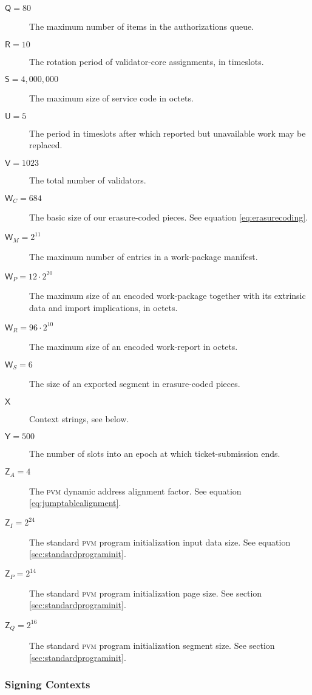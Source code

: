 \begin{description}
  \item[$\mathsf{Q} = 80$] The maximum number of items in the authorizations queue.
  \item[$\mathsf{R} = 10$] The rotation period of validator-core assignments, in timeslots.
  \item[$\mathsf{S} = 4,000,000$] The maximum size of service code in octets.
  \item[$\mathsf{U} = 5$] The period in timeslots after which reported but unavailable work may be replaced.
  \item[$\mathsf{V} = 1023$] The total number of validators.
  \item[$\mathsf{W}_C = 684$] The basic size of our erasure-coded pieces. See equation \ref{eq:erasurecoding}.
  \item[$\mathsf{W}_M = 2^{11}$] The maximum number of entries in a work-package manifest.
  \item[$\mathsf{W}_P = 12\cdot2^{20}$] The maximum size of an encoded work-package together with its extrinsic data and import implications, in octets.
  \item[$\mathsf{W}_R = 96\cdot2^{10}$] The maximum size of an encoded work-report in octets.
  \item[$\mathsf{W}_S = 6$] The size of an exported segment in erasure-coded pieces.
  \item[$\mathsf{X}$] Context strings, see below.
  \item[$\mathsf{Y} = 500$] The number of slots into an epoch at which ticket-submission ends.
  \item[$\mathsf{Z}_A = 4$] The \textsc{pvm} dynamic address alignment factor. See equation \ref{eq:jumptablealignment}.
  \item[$\mathsf{Z}_I = 2^{24}$] The standard \textsc{pvm} program initialization input data size. See equation \ref{sec:standardprograminit}.
  \item[$\mathsf{Z}_P = 2^{14}$] The standard \textsc{pvm} program initialization page size. See section \ref{sec:standardprograminit}.
  \item[$\mathsf{Z}_Q = 2^{16}$] The standard \textsc{pvm} program initialization segment size. See section \ref{sec:standardprograminit}.
\end{description}

\subsubsection{Signing Contexts}

